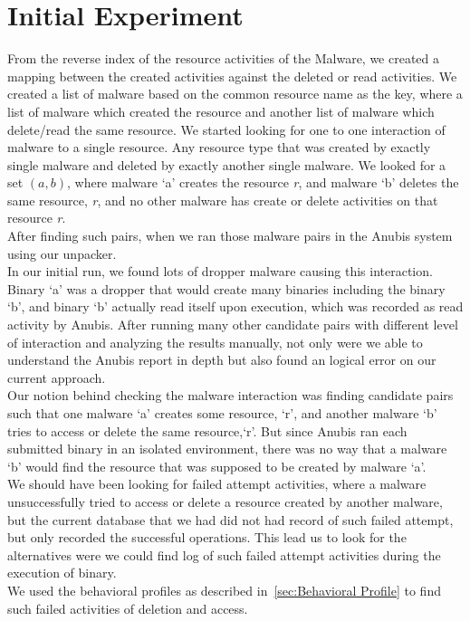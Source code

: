 \section{Initial Experiment}
\label{sec:Initial Experiment}
From the reverse index of the resource activities of the Malware, we created a mapping between the created activities against the deleted or read activities.
We created a list of malware based on the common resource name as the key, where a list of malware which created the resource and another list of malware which delete/read the same resource.
We started looking for one to one interaction of malware to a single resource. Any resource type that was created by exactly single malware and deleted by exactly another single malware.
We looked for a set $(a, b)$, where malware `a' creates the resource \emph{r}, and malware `b' deletes the same resource, \emph{r}, and no other malware has create or delete activities on that resource \emph{r}.\\
After finding such pairs, when we ran those malware pairs in the Anubis system using our unpacker.\\
In our initial run, we found lots of dropper malware causing this interaction. Binary `a' was a dropper that would create many binaries including the binary `b', and binary `b' actually read itself upon execution, which was recorded as read activity by Anubis.
After running many other candidate pairs with different level of interaction and analyzing the results manually, not only were we able to understand the Anubis report in depth but also found an logical error on our current approach.\\
Our notion behind checking the malware interaction was finding candidate pairs such that one malware `a' creates some resource, `r', and another malware `b' tries to access or delete the same resource,`r'.
But since Anubis ran each submitted binary in an isolated environment, there was no way that a malware `b' would find the resource that was supposed to be created by malware `a'.\\
We should have been looking for failed attempt activities, where a malware unsuccessfully tried to access or delete a resource created by another malware, but the current database that we had did not had record of such failed attempt, but only recorded the successful operations.
This lead us to look for the alternatives were we could find log of such failed attempt activities during the execution of binary.\\
We used the behavioral profiles as described in~\autoref{sec:Behavioral Profile} to find such failed activities of deletion and access.
